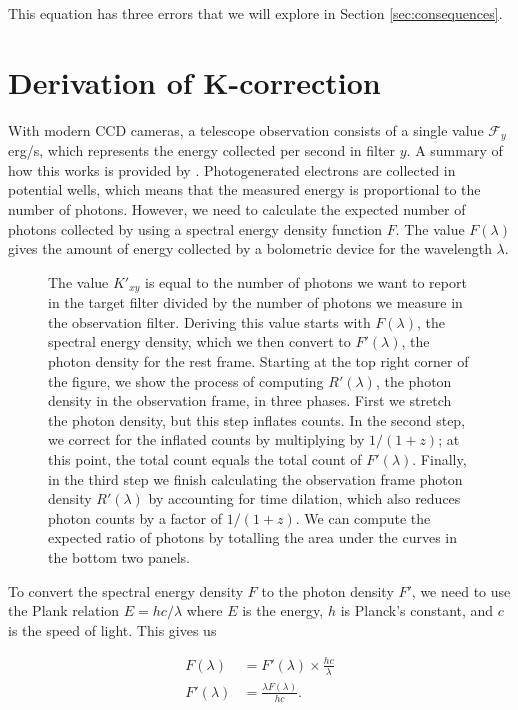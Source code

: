 \documentclass[linenumbers]{aastex631}
\begin{document}
This equation has three errors that we will explore in Section
\ref{sec:consequences}.

\section{Derivation of K-correction}
\label{sec:derivation}

With modern CCD cameras, a telescope observation consists of a single value
$\mathcal{F}_y$ erg/s, which represents the energy collected per second in
filter $y$. A summary of how this works is provided by \citet{lesser2015}.
Photogenerated electrons are collected in potential wells, which means that the
measured energy is proportional to the number of photons. However, we need to
calculate the expected number of photons collected by using a spectral energy
density function $F$. The value $F(\lambda)$ gives the amount of energy
collected by a bolometric device for the wavelength $\lambda$.

\begin{figure}
  \caption{The value $K'_{xy}$ is equal to the number of photons we want to
  report in the target filter divided by the number of photons we measure in
  the observation filter.  Deriving this value starts with $F(\lambda)$, the
  spectral energy density, which we then convert to $F'(\lambda)$, the photon
  density for the rest frame.  Starting at the top right corner of the figure,
  we show the process of computing $R'(\lambda)$, the photon density in the
  observation frame, in three phases. First we stretch the photon density, but
  this step inflates counts. In the second step, we correct for the inflated
  counts by multiplying by $1/(1+z)$; at this point, the total count equals the
  total count of $F'(\lambda)$. Finally, in the third step we finish
  calculating the observation frame photon density $R'(\lambda)$ by accounting
  for time dilation, which also reduces photon counts by a factor of $1/(1+z)$.
  We can compute the expected ratio of photons by totalling the area under the
  curves in the bottom two panels.
  }
  \label{fig:k-example}
\end{figure}

To convert the spectral energy density $F$ to the photon density $F'$, we need
to use the Plank relation $E = hc / \lambda$ where $E$ is the energy, $h$
is Planck's constant, and $c$ is the speed of light. This gives us

\begin{equation}
\begin{aligned}
   F(\lambda) &= F'(\lambda) \times \frac{hc}{\lambda} \\
  F'(\lambda) &= \frac{\lambda F(\lambda)}{hc}.
\end{aligned}
\end{equation}
\end{document}
